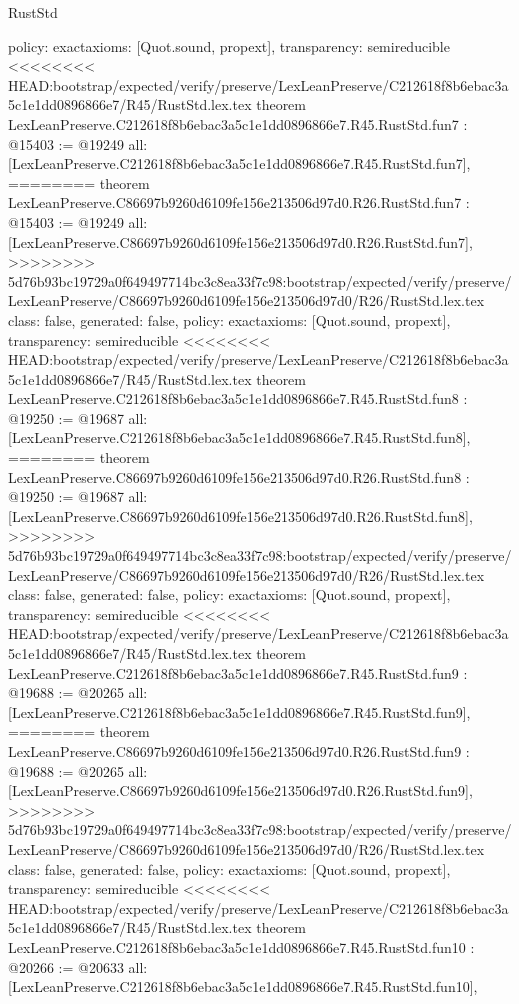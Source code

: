 \begin{lexlean}{RustStd}
\begin{coremodule}
{\begin{coremodule}
{{{{{{{{{{  policy: exact{axioms: [Quot.sound, propext]},
  transparency: semireducible
}
<<<<<<<< HEAD:bootstrap/expected/verify/preserve/LexLeanPreserve/C212618f8b6ebac3a5c1e1dd0896866e7/R45/RustStd.lex.tex
theorem LexLeanPreserve.C212618f8b6ebac3a5c1e1dd0896866e7.R45.RustStd.fun7 : @15403 := @19249 {
  all: [LexLeanPreserve.C212618f8b6ebac3a5c1e1dd0896866e7.R45.RustStd.fun7],
========
theorem LexLeanPreserve.C86697b9260d6109fe156e213506d97d0.R26.RustStd.fun7 : @15403 := @19249 {
  all: [LexLeanPreserve.C86697b9260d6109fe156e213506d97d0.R26.RustStd.fun7],
>>>>>>>> 5d76b93bc19729a0f649497714bc3c8ea33f7c98:bootstrap/expected/verify/preserve/LexLeanPreserve/C86697b9260d6109fe156e213506d97d0/R26/RustStd.lex.tex
  class: false,
  generated: false,
  policy: exact{axioms: [Quot.sound, propext]},
  transparency: semireducible
}
<<<<<<<< HEAD:bootstrap/expected/verify/preserve/LexLeanPreserve/C212618f8b6ebac3a5c1e1dd0896866e7/R45/RustStd.lex.tex
theorem LexLeanPreserve.C212618f8b6ebac3a5c1e1dd0896866e7.R45.RustStd.fun8 : @19250 := @19687 {
  all: [LexLeanPreserve.C212618f8b6ebac3a5c1e1dd0896866e7.R45.RustStd.fun8],
========
theorem LexLeanPreserve.C86697b9260d6109fe156e213506d97d0.R26.RustStd.fun8 : @19250 := @19687 {
  all: [LexLeanPreserve.C86697b9260d6109fe156e213506d97d0.R26.RustStd.fun8],
>>>>>>>> 5d76b93bc19729a0f649497714bc3c8ea33f7c98:bootstrap/expected/verify/preserve/LexLeanPreserve/C86697b9260d6109fe156e213506d97d0/R26/RustStd.lex.tex
  class: false,
  generated: false,
  policy: exact{axioms: [Quot.sound, propext]},
  transparency: semireducible
}
<<<<<<<< HEAD:bootstrap/expected/verify/preserve/LexLeanPreserve/C212618f8b6ebac3a5c1e1dd0896866e7/R45/RustStd.lex.tex
theorem LexLeanPreserve.C212618f8b6ebac3a5c1e1dd0896866e7.R45.RustStd.fun9 : @19688 := @20265 {
  all: [LexLeanPreserve.C212618f8b6ebac3a5c1e1dd0896866e7.R45.RustStd.fun9],
========
theorem LexLeanPreserve.C86697b9260d6109fe156e213506d97d0.R26.RustStd.fun9 : @19688 := @20265 {
  all: [LexLeanPreserve.C86697b9260d6109fe156e213506d97d0.R26.RustStd.fun9],
>>>>>>>> 5d76b93bc19729a0f649497714bc3c8ea33f7c98:bootstrap/expected/verify/preserve/LexLeanPreserve/C86697b9260d6109fe156e213506d97d0/R26/RustStd.lex.tex
  class: false,
  generated: false,
  policy: exact{axioms: [Quot.sound, propext]},
  transparency: semireducible
}
<<<<<<<< HEAD:bootstrap/expected/verify/preserve/LexLeanPreserve/C212618f8b6ebac3a5c1e1dd0896866e7/R45/RustStd.lex.tex
theorem LexLeanPreserve.C212618f8b6ebac3a5c1e1dd0896866e7.R45.RustStd.fun10 : @20266 := @20633 {
  all: [LexLeanPreserve.C212618f8b6ebac3a5c1e1dd0896866e7.R45.RustStd.fun10],
}}}}}}}}}}}}}
\end{coremodule}}
\end{coremodule}
\end{lexlean}

